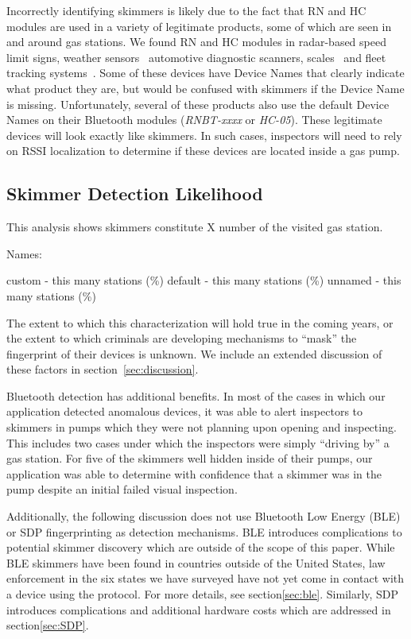 
Incorrectly identifying skimmers is likely due to the fact that  RN and HC
modules are used in a variety of legitimate products, some of which are seen in
and around gas stations.
%
We found RN and HC modules in radar-based speed limit signs, weather
sensors~\cite{rnbtweathersensor} automotive diagnostic scanners,
scales~\cite{rnbtscale} and fleet tracking systems~\cite{rnbteletrac}.
%
Some of these devices have Device Names that clearly indicate what product they
are, but would be confused with skimmers if the Device Name
is missing.
%
Unfortunately, several of these products also use the default Device Names on
their Bluetooth modules (\emph{RNBT-xxxx} or \emph{HC-05}).
%
These legitimate devices will look exactly like skimmers.
%
In such cases, inspectors will need to rely on RSSI localization to determine if these devices
are located inside a gas pump.

\subsection{Skimmer Detection Likelihood}
This analysis shows skimmers constitute X number of the visited gas station.

Names:

custom - this many stations (\%)
default - this many stations (\%)
unnamed - this many stations (\%)

The extent to which this characterization will hold true in the coming years, or the extent to which criminals are
developing mechanisms to ``mask'' the fingerprint of their devices is unknown.
%
We include an extended discussion of these factors in section~\ref{sec:discussion}.

Bluetooth detection has additional benefits.
%
In most of the cases in which our application detected anomalous devices, it was able to alert inspectors to skimmers
in pumps which they were not planning upon opening and inspecting.
%
This includes two cases under which the inspectors were simply ``driving by'' a gas station.
%
For five of the skimmers well hidden inside of their pumps, our application was able to determine with confidence
that a skimmer was in the pump despite an initial failed visual inspection.



Additionally, the following discussion does not use Bluetooth Low Energy (BLE) or SDP fingerprinting as detection
mechanisms.
%
BLE introduces complications to potential skimmer discovery which are outside of the scope of this paper.
%
While BLE skimmers have been found in countries outside of the United States, law enforcement in the six states we have
surveyed have not yet come in contact with a device using the protocol.
%
For more details, see section\ref{sec:ble}.
%
Similarly, SDP introduces complications and additional hardware costs which are addressed in section\ref{sec:SDP}.


